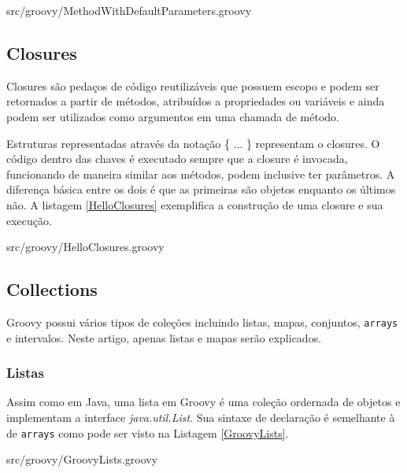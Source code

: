 \documentclass[12pt]{article}
\begin{document}
    
                    {src/groovy/MethodWithDefaultParameters.groovy}

\subsection{Closures}

    Closures são pedaços de código reutilizáveis que possuem escopo e podem ser 
    retornados a partir de métodos, atribuídos a propriedades ou variáveis e 
    ainda podem ser utilizados como argumentos em uma chamada de método. 
    
    Estruturas representadas através da notação \{ ... \} representam o closures.
    O código dentro das chaves é executado sempre que a closure é invocada, 
    funcionando de maneira similar aos métodos, podem inclusive ter parâmetros. 
    A diferença básica entre os dois é que as primeiras são objetos enquanto os 
    últimos não. A listagem \ref{HelloClosures} exemplifica a construção de uma 
    closure e sua execução.
    
    
                    {src/groovy/HelloClosures.groovy}
    
\subsection{Collections}

    Groovy possui vários tipos de coleções incluindo listas, mapas, conjuntos,
    \texttt{arrays} e intervalos. Neste artigo, apenas listas e mapas serão explicados.
    
\subsubsection{Listas}

    Assim como em Java, uma lista em Groovy é uma coleção ordernada de objetos e 
    implementam a interface \emph{java.util.List}. Sua sintaxe de declaração é 
    semelhante à de \texttt{arrays} como pode ser visto na Listagem \ref{GroovyLists}.
    
    
                    {src/groovy/GroovyLists.groovy}
\end{document}
